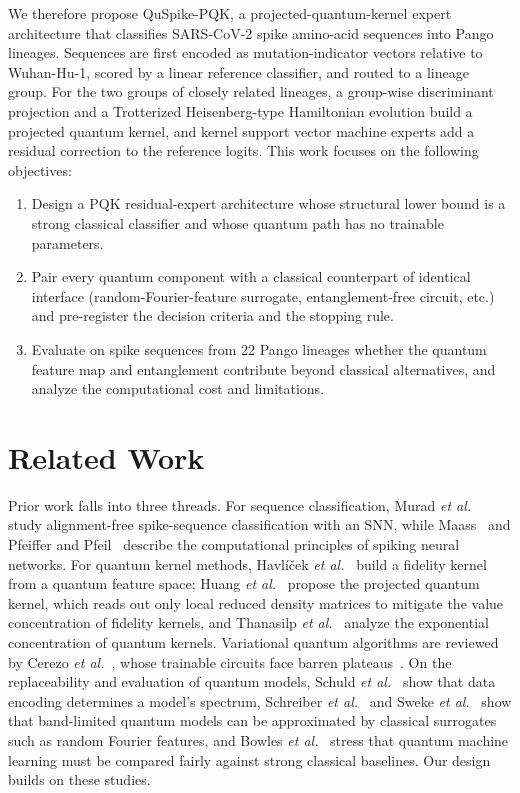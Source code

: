\documentclass[conference]{IEEEtran}
\begin{document}
We therefore propose QuSpike-PQK, a projected-quantum-kernel expert architecture that classifies SARS-CoV-2 spike amino-acid sequences into Pango lineages. Sequences are first encoded as mutation-indicator vectors relative to Wuhan-Hu-1, scored by a linear reference classifier, and routed to a lineage group. For the two groups of closely related lineages, a group-wise discriminant projection and a Trotterized Heisenberg-type Hamiltonian evolution build a projected quantum kernel, and kernel support vector machine experts add a residual correction to the reference logits. This work focuses on the following objectives:
\begin{enumerate}
    \item Design a PQK residual-expert architecture whose structural lower bound is a strong classical classifier and whose quantum path has no trainable parameters.
    \item Pair every quantum component with a classical counterpart of identical interface (random-Fourier-feature surrogate, entanglement-free circuit, etc.) and pre-register the decision criteria and the stopping rule.
    \item Evaluate on spike sequences from 22 Pango lineages whether the quantum feature map and entanglement contribute beyond classical alternatives, and analyze the computational cost and limitations.
\end{enumerate}

\section{Related Work}
\label{sec:related-work}

Prior work falls into three threads. For sequence classification, Murad \textit{et al.}~\cite{murad2024snn} study alignment-free spike-sequence classification with an SNN, while Maass~\cite{maass1997} and Pfeiffer and Pfeil~\cite{pfeiffer2018} describe the computational principles of spiking neural networks. For quantum kernel methods, Havl\'{i}\v{c}ek \textit{et al.}~\cite{havlicek2019} build a fidelity kernel from a quantum feature space; Huang \textit{et al.}~\cite{huang2021power} propose the projected quantum kernel, which reads out only local reduced density matrices to mitigate the value concentration of fidelity kernels, and Thanasilp \textit{et al.}~\cite{thanasilp2024concentration} analyze the exponential concentration of quantum kernels. Variational quantum algorithms are reviewed by Cerezo \textit{et al.}~\cite{cerezo2021vqa}, whose trainable circuits face barren plateaus~\cite{mcclean2018barren}. On the replaceability and evaluation of quantum models, Schuld \textit{et al.}~\cite{schuld2021effect} show that data encoding determines a model's spectrum, Schreiber \textit{et al.}~\cite{schreiber2023surrogates} and Sweke \textit{et al.}~\cite{sweke2023rff} show that band-limited quantum models can be approximated by classical surrogates such as random Fourier features, and Bowles \textit{et al.}~\cite{bowles2024better} stress that quantum machine learning must be compared fairly against strong classical baselines. Our design builds on these studies.
\end{document}
